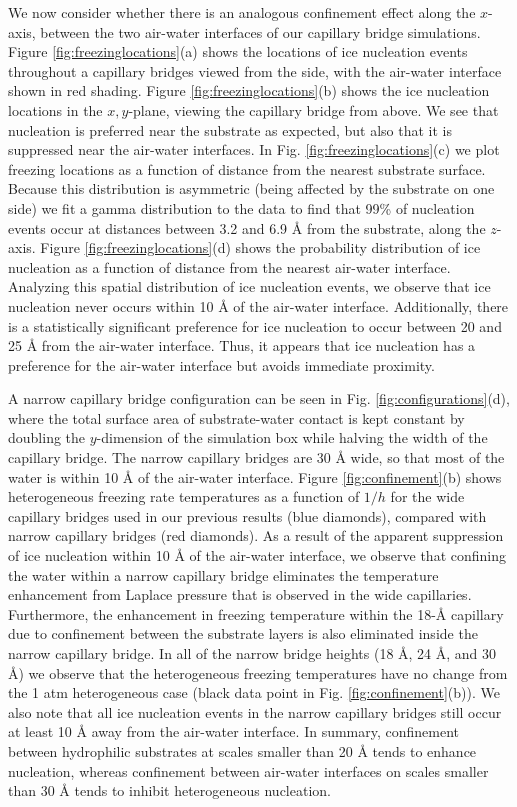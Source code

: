 \documentclass[journal abbreviation, manuscript]{copernicus}
\begin{document}
We now consider whether there is an analogous confinement effect along the $x$-axis, between the two air-water interfaces of our capillary bridge simulations. Figure \ref{fig:freezinglocations}(a) shows the locations of ice nucleation events throughout a capillary bridges viewed from the side, with the air-water interface shown in red shading. Figure \ref{fig:freezinglocations}(b) shows the ice nucleation locations in the $x,y$-plane, viewing the capillary bridge from above. We see that nucleation is preferred near the substrate as expected, but also that it is suppressed near the air-water interfaces. In Fig. \ref{fig:freezinglocations}(c) we plot freezing locations as a function of distance from the nearest substrate surface. Because this distribution is asymmetric (being affected by the substrate on one side) we fit a gamma distribution to the data to find that 99\% of nucleation events occur at distances between 3.2 and 6.9 \AA{} from the substrate, along the $z$-axis. Figure \ref{fig:freezinglocations}(d) shows the probability distribution of ice nucleation as a function of distance from the nearest air-water interface. Analyzing this spatial distribution of ice nucleation events, we observe that ice nucleation never occurs within 10 \AA{} of the air-water interface. Additionally, there is a statistically significant preference for ice nucleation to occur between 20 and 25 \AA{} from the air-water interface. Thus, it appears that ice nucleation has a preference for the air-water interface but avoids immediate proximity.

A narrow capillary bridge configuration can be seen in Fig. \ref{fig:configurations}(d), where the total surface area of substrate-water contact is kept constant by doubling the $y$-dimension of the simulation box while halving the width of the capillary bridge. The narrow capillary bridges are 30 \AA{} wide, so that most of the water is within 10 \AA{} of the air-water interface. Figure \ref{fig:confinement}(b) shows heterogeneous freezing rate temperatures as a function of $1/h$ for the wide capillary bridges used in our previous results (blue diamonds), compared with narrow capillary bridges (red diamonds). As a result of the apparent suppression of ice nucleation within 10 \AA{} of the air-water interface, we observe that confining the water within a narrow capillary bridge eliminates the temperature enhancement from Laplace pressure that is observed in the wide capillaries. Furthermore, the enhancement in freezing temperature within the 18-\AA{} capillary due to confinement between the substrate layers is also eliminated inside the narrow capillary bridge. In all of the narrow bridge heights (18 \AA{}, 24 \AA{}, and 30 \AA{}) we observe that the heterogeneous freezing temperatures have no change from the 1 atm heterogeneous case (black data point in Fig. \ref{fig:confinement}(b)). We also note that all ice nucleation events in the narrow capillary bridges still occur at least 10 \AA{} away from the air-water interface. In summary, confinement between hydrophilic substrates at scales smaller than 20 \AA{} tends to enhance nucleation, whereas confinement between air-water interfaces on scales smaller than 30 \AA{} tends to inhibit heterogeneous nucleation.
\end{document}
